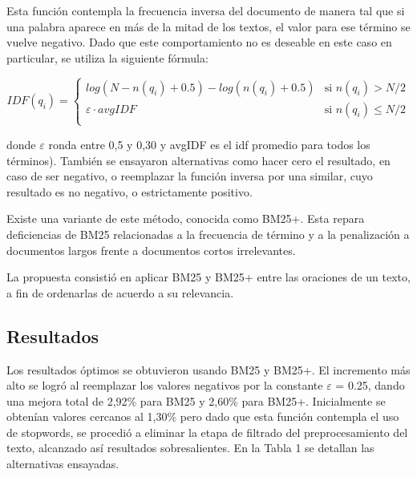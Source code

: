 \documentclass[a4paper]{article}
\begin{document}
Esta función contempla la frecuencia inversa del documento de manera tal que si una palabra aparece en más de la mitad de los textos, el valor para ese término se vuelve negativo. Dado que este comportamiento no es deseable en este caso en particular, se utiliza la siguiente fórmula:
                
\begin{equation}
 IDF(q_i) =
  \begin{cases}
       log(N - n(q_i) + 0.5) - log(n(q_i) + 0.5)    & \text{si }  n(q_i) > N/2\\
       \varepsilon \cdot avgIDF                     & \text{si }  n(q_i) \leq N/2\\
  \end{cases}
\end{equation}                
                
donde $\varepsilon$ ronda entre 0,5 y 0,30 y avgIDF es el idf promedio para todos los términos).
También se ensayaron alternativas como hacer cero el resultado, en caso de ser negativo, o reemplazar la función inversa por una similar, cuyo resultado es no negativo, o estrictamente positivo. 

Existe una variante de este método, conocida como BM25+. Esta repara deficiencias de BM25 relacionadas a la frecuencia de término y a la penalización a documentos largos frente a documentos cortos irrelevantes.

La propuesta consistió en aplicar BM25 y BM25+ entre las oraciones de un texto, a fin de ordenarlas de acuerdo a su relevancia.


\subsection{Resultados}
Los resultados óptimos se obtuvieron usando BM25 y BM25+. El incremento más alto se logró al reemplazar los valores negativos por la constante $\varepsilon$ = 0.25, dando una mejora total de 2,92\% para BM25 y 2,60\% para BM25+. Inicialmente se obtenían valores cercanos al 1,30\% pero dado que esta función contempla el uso de stopwords, se procedió a eliminar la etapa de filtrado del preprocesamiento del texto, alcanzado así resultados sobresalientes. En la Tabla 1 se detallan las alternativas ensayadas.
\end{document}
